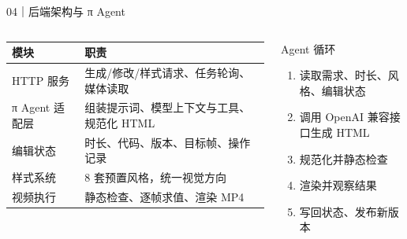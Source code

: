 \documentclass[aspectratio=169,UTF8,11pt]{ctexbeamer}
\begin{document}
\begin{frame}{04｜后端架构与 π Agent}
  \begin{columns}[T,onlytextwidth]
      \small
      \begin{tabularx}{\linewidth}{@{}p{2.6cm}X@{}}
        \toprule
        \textbf{模块} & \textbf{职责} \\
        \midrule
        HTTP 服务 & 生成/修改/样式请求、任务轮询、媒体读取 \\
        π Agent 适配层 & 组装提示词、模型上下文与工具、规范化 HTML \\
        编辑状态 & 时长、代码、版本、目标帧、操作记录 \\
        样式系统 & 8 套预置风格，统一视觉方向 \\
        视频执行 & 静态检查、逐帧求值、渲染 MP4 \\
        \bottomrule
      \end{tabularx}
      \begin{block}{Agent 循环}
        \begin{enumerate}
          \item 读取需求、时长、风格、编辑状态
          \item 调用 OpenAI 兼容接口生成 HTML
          \item 规范化并静态检查
          \item 渲染并观察结果
          \item 写回状态、发布新版本
        \end{enumerate}
      \end{block}
  \end{columns}
\end{frame}
\end{document}
